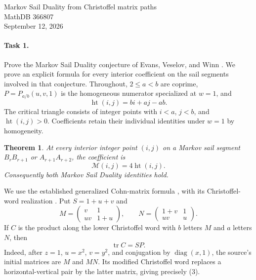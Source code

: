 \documentclass[11pt]{article}
\newtheorem{theorem}{Theorem}
\newcommand{\tr}{\operatorname{tr}}
\newcommand{\HH}{\operatorname{ht}}
\begin{document}
\begin{center}
{\Large Markov Sail Duality from Christoffel matrix paths}\\[0.5em]
MathDB 366807\\ September 12, 2026
\end{center}

\paragraph{Task 1.}
Prove the Markov Sail Duality conjecture of Evans, Veselov, and Winn
\cite[Conjecture 8.3]{EVW}. We prove an explicit formula for every
interior coefficient on the sail segments involved in that conjecture.
Throughout, $2\leq a<b$ are coprime, $P=P_{a/b}(u,v,1)$ is the
homogeneous numerator specialized at $w=1$, and
\[
 \HH(i,j)=bi+aj-ab.
\]
The critical triangle consists of integer points with $i<a$, $j<b$,
and $\HH(i,j)>0$. Coefficients retain their individual identities
under $w=1$ by homogeneity.

\begin{theorem}\label{main}
At every interior integer point $(i,j)$ on a Markov sail segment
$B_rB_{r+1}$ or $A_{r+1}A_{r+2}$, the coefficient is
\[
 \mathcal M(i,j)=4\HH(i,j).
 \tag{1}
\]
Consequently both Markov Sail Duality identities hold.
\end{theorem}

We use the established generalized Cohn-matrix formula
\cite[Theorem 10.1]{EVW}, with its Christoffel-word realization
\cite[Sections 2.1.2, 2.7.2 and Theorem 2.7.5]{E}.
Put $S=1+u+v$ and
\[
 M=\begin{pmatrix}v&1\\uv&1+u\end{pmatrix},\qquad
 N=\begin{pmatrix}1+v&1\\uv&u\end{pmatrix}.
 \tag{2}
\]
If $C$ is the product along the lower Christoffel word with $b$
letters $M$ and $a$ letters $N$, then
\[
 \tr C=SP.
 \tag{3}
\]
Indeed, after $z=1$, $u=x^2$, $v=y^2$, and conjugation by
$\operatorname{diag}(x,1)$, the source's initial matrices are $M$
and $MN$. Its modified Christoffel word replaces a horizontal-vertical
pair by the latter matrix, giving precisely (3).
\end{document}
